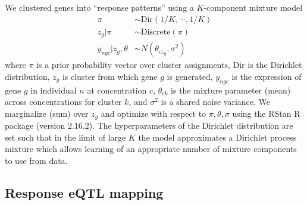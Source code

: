 \documentclass{article}
\begin{document}
{We clustered genes into ``response patterns'' using a $K$-component mixture model 
\begin{align}
\pi &\sim \text{Dir}(1/K,\cdots,1/K) \nonumber \\ 
z_g | \pi &\sim \text{Discrete}(\pi) \nonumber \\
y_{ngc} | z_g, \theta &\sim N( \theta_{cz_g}, \sigma^2 )
\label{eq:mixture}
\end{align}
where $\pi$ is a prior probability vector over cluster assignments, Dir is the Dirichlet distribution, $z_g$ is cluster from which gene $g$ is generated, $y_{ngc}$ is the expression of gene $g$ in individual $n$ at concentration $c$, $\theta_{ck}$ is the mixture parameter (mean) across concentrations for cluster $k$, and $\sigma^2$ is a shared noise variance. 
We marginalize (sum) over $z_g$ and optimize with respect to $\pi, \theta, \sigma$ using the RStan R package (version 2.16.2). 
The hyperparameters of the Dirichlet distribution are set such that in the limit of large $K$ the model approximates a Dirichlet process mixture \cite{maceachern1998estimating} which allows learning of an appropriate number of mixture components to use from data. 

\subsection*{Response eQTL mapping} 

}
\end{document}

